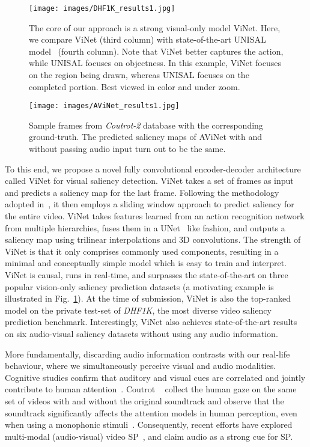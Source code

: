 \documentclass[letterpaper, 10 pt, conference]{ieeeconf}  \usepackage{times}
\begin{document}
\begin{figure}[t]
\centering
\texttt{[image: images/DHF1K\_results1.jpg]}
\caption{{The core of our approach is a strong visual-only model ViNet. Here, we compare ViNet (third column) with state-of-the-art UNISAL model~\cite{droste2020unified} (fourth column). Note that ViNet better captures the action, while UNISAL focuses on objectness. In this example, ViNet focuses on the region being drawn, whereas UNISAL focuses on the completed portion. Best viewed in color and under zoom.}}\vspace{-.1cm}
\label{fig:DHF1K_results}
\end{figure}

\begin{figure*}[t]
\centering
\texttt{[image: images/AViNet\_results1.jpg]}
\caption{{Sample frames from \emph{Coutrot-2} database with the corresponding ground-truth. The predicted saliency maps of AViNet with and without passing audio input turn out to be the same.}}\vspace{-.1cm}
\label{fig:avinet_results}
\end{figure*}

To this end, we propose a novel fully convolutional encoder-decoder architecture called ViNet for visual saliency detection. ViNet takes a set of frames as input and predicts a saliency map for the last frame. Following the methodology adopted in~\cite{min2019tased}, it then employs a sliding window approach to predict saliency for the entire video. ViNet takes features learned from an action recognition network from multiple hierarchies, fuses them in a UNet~\cite{ronneberger2015u} like fashion, and outputs a saliency map using trilinear interpolations and 3D convolutions. The strength of ViNet is that it only comprises commonly used components, resulting in a minimal and conceptually simple model which is easy to train and interpret. ViNet is causal, runs in real-time, and surpasses the state-of-the-art on three popular vision-only saliency prediction datasets (a motivating example is illustrated in Fig.~\ref{fig:DHF1K_results}). At the time of submission, ViNet is also the top-ranked model on the private test-set of \emph{DHF1K}, the most diverse video saliency prediction benchmark. Interestingly, ViNet also achieves state-of-the-art results on six audio-visual saliency datasets without using any audio information. 


More fundamentally, discarding audio information contrasts with our real-life behaviour, where we simultaneously perceive visual and audio modalities. Cognitive studies confirm that auditory and visual cues are correlated and jointly contribute to human attention~\cite{van2008audiovisual}. Coutrot \etal ~\cite{coutrot2012influence} collect the human gaze on the same set of videos with and without the original soundtrack and observe that the soundtrack significantly affects the attention models in human perception, even when using a monophonic stimuli~\cite{coutrot2012influence}. Consequently, recent efforts have explored multi-modal (audio-visual) video SP~\cite{tavakoli2019dave,tsiami2020stavis}, and claim audio as a strong  cue for SP. 
\end{document}
